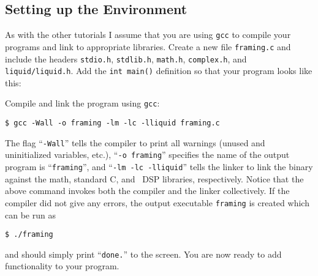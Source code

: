 %
%
\subsection{Setting up the Environment}
\label{tutorial:framing:environment}

As with the other tutorials I assume that you are using {\tt gcc} to
compile your programs and link to appropriate libraries.
Create a new file {\tt framing.c} and include the headers
{\tt stdio.h},
{\tt stdlib.h},
{\tt math.h},
{\tt complex.h}, and
{\tt liquid/liquid.h}.
Add the {\tt int main()} definition so that your program looks like
this:
%

%
Compile and link the program using {\tt gcc}:
%
\begin{Verbatim}[fontsize=\small]
    $ gcc -Wall -o framing -lm -lc -lliquid framing.c
\end{Verbatim}
%
The flag ``{\tt -Wall}'' tells the compiler to print all warnings
(unused and uninitialized variables, etc.),
``{\tt -o framing}'' specifies the name of the output program is
``{\tt framing}'', and
``{\tt -lm -lc -lliquid}'' tells the linker to link the binary against
the math, standard C, and \liquid\ DSP libraries, respectively.
Notice that the above command invokes both the compiler and the linker
collectively.
%
If the compiler did not give any errors, the output executable
{\tt framing} is created which can be run as
%
\begin{Verbatim}[fontsize=\small]
    $ ./framing
\end{Verbatim}
%
and should simply print ``{\tt done.}'' to the screen.
You are now ready to add functionality to your program.



%
%

